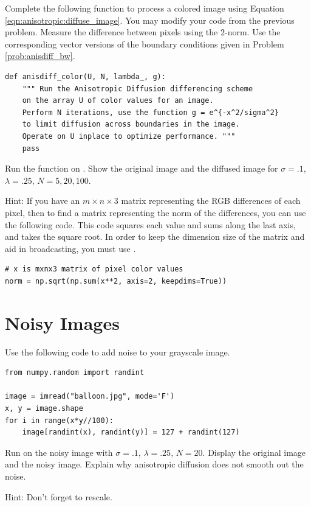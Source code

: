 \begin{problem}
Complete the following function to process a colored image using Equation \eqref{eqn:anisotropic:diffuse_image}.
You may modify your code from the previous problem.
Measure the difference between pixels using the $2$-norm.
Use the corresponding vector versions of the boundary conditions given in Problem \ref{prob:anisdiff_bw}.

\begin{lstlisting}
def anisdiff_color(U, N, lambda_, g):
    """ Run the Anisotropic Diffusion differencing scheme
    on the array U of color values for an image.
    Perform N iterations, use the function g = e^{-x^2/sigma^2}
    to limit diffusion across boundaries in the image.
    Operate on U inplace to optimize performance. """
    pass
\end{lstlisting}
Run the function on .
Show the original image and the diffused image for $\sigma = .1$, $\lambda = .25$, $N = 5, 20, 100$.

Hint: If you have an $m \times n \times 3$ matrix representing the RGB differences of each pixel, then to find a matrix representing the norm of the differences, you can use the following code.
This code squares each value and sums along the last axis, and takes the square root.
In order to keep the dimension size of the matrix and aid in broadcasting, you must use .

\begin{lstlisting}
# x is mxnx3 matrix of pixel color values
norm = np.sqrt(np.sum(x**2, axis=2, keepdims=True))
\end{lstlisting}

\end{problem}

\newpage
\section*{Noisy Images}

\begin{problem}
Use the following code to add noise to your grayscale image.

\begin{lstlisting}
from numpy.random import randint

image = imread("balloon.jpg", mode='F')
x, y = image.shape
for i in range(x*y//100):
	image[randint(x), randint(y)] = 127 + randint(127)
\end{lstlisting}

Run  on the noisy image with $\sigma=.1$, $\lambda=.25$, $N=20$.
Display the original image and the noisy image.
Explain why anisotropic diffusion does not smooth out the noise.

Hint: Don't forget to rescale.
\end{problem}


